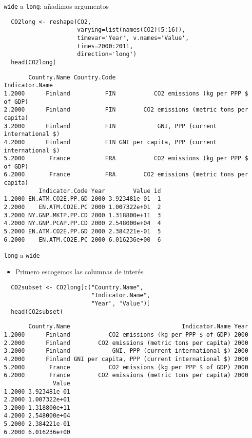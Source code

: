 \documentclass[xcolor={usenames,svgnames,dvipsnames}]{beamer}
\begin{document}
\begin{frame}[fragile,label=sec-3-2-2]{\texttt{wide} a \texttt{long}: añadimos argumentos}
 \lstset{language=R,label= ,caption= ,numbers=none}
\begin{lstlisting}
  CO2long <- reshape(CO2,
                     varying=list(names(CO2)[5:16]),
                     timevar='Year', v.names='Value',
                     times=2000:2011,
                     direction='long')
  head(CO2long)
\end{lstlisting}

\begin{verbatim}
       Country.Name Country.Code                                Indicator.Name
1.2000      Finland          FIN           CO2 emissions (kg per PPP $ of GDP)
2.2000      Finland          FIN        CO2 emissions (metric tons per capita)
3.2000      Finland          FIN            GNI, PPP (current international $)
4.2000      Finland          FIN GNI per capita, PPP (current international $)
5.2000       France          FRA           CO2 emissions (kg per PPP $ of GDP)
6.2000       France          FRA        CO2 emissions (metric tons per capita)
          Indicator.Code Year        Value id
1.2000 EN.ATM.CO2E.PP.GD 2000 3.923481e-01  1
2.2000    EN.ATM.CO2E.PC 2000 1.007322e+01  2
3.2000 NY.GNP.MKTP.PP.CD 2000 1.318800e+11  3
4.2000 NY.GNP.PCAP.PP.CD 2000 2.548000e+04  4
5.2000 EN.ATM.CO2E.PP.GD 2000 2.384221e-01  5
6.2000    EN.ATM.CO2E.PC 2000 6.016236e+00  6
\end{verbatim}
\end{frame}

\begin{frame}[fragile,label=sec-3-2-3]{\texttt{long} a \texttt{wide}}
 \begin{itemize}
\item Primero escogemos las columnas de interés
\end{itemize}
\lstset{language=R,label= ,caption= ,numbers=none}
\begin{lstlisting}
  CO2subset <- CO2long[c("Country.Name",
                         "Indicator.Name",
                         "Year", "Value")]
  head(CO2subset)
\end{lstlisting}

\begin{verbatim}
       Country.Name                                Indicator.Name Year
1.2000      Finland           CO2 emissions (kg per PPP $ of GDP) 2000
2.2000      Finland        CO2 emissions (metric tons per capita) 2000
3.2000      Finland            GNI, PPP (current international $) 2000
4.2000      Finland GNI per capita, PPP (current international $) 2000
5.2000       France           CO2 emissions (kg per PPP $ of GDP) 2000
6.2000       France        CO2 emissions (metric tons per capita) 2000
              Value
1.2000 3.923481e-01
2.2000 1.007322e+01
3.2000 1.318800e+11
4.2000 2.548000e+04
5.2000 2.384221e-01
6.2000 6.016236e+00
\end{verbatim}
\end{frame}
\end{document}
